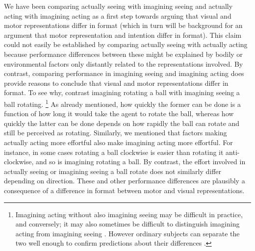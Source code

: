 \documentclass[12pt,\papersize]{extarticle}
\begin{document}
We have been comparing actually seeing with imagining seeing and actually acting with imagining acting as a first step towards arguing that visual and motor representations differ in format (which in turn will be background for an argument that motor representation and intention differ in format).  This claim could not easily be established by comparing actually seeing with actually acting because performance differences between these might be explained by bodily or environmental factors only distantly related to the representations involved. By contrast, comparing performance in imagining seeing and imagining acting does provide reasons to conclude that visual and motor representations differ in format. To see why, contrast imagining rotating a ball with imagining seeing a ball rotating.%
\footnote{Imagining acting without also imagining seeing may be difficult in practice, and conversely; it may also sometimes be difficult to distinguish imagining acting from imagining seeing \citep[as][p.\ 170 suggest]{currie:1997_mental}. However ordinary subjects can separate the two well enough to confirm predictions about their differences \citep[see, e.g.,][]{kosslyn:2001_imagining}.
}
As already mentioned, how quickly the former can be done is a function of how long it would take the agent to rotate the ball, whereas how quickly the latter can be done depends on how rapidly the ball can rotate and still be perceived as rotating. Similarly, we mentioned that factors making actually acting more effortful also make imagining acting more effortful. For instance, in some cases rotating a ball clockwise is easier than rotating it anti-clockwise, 
and so is imagining rotating a ball.  By contrast, the effort involved in actually seeing or imagining seeing a ball rotate does not similarly differ depending on direction.  These and other performance differences are plausibly a consequence of a difference in format between motor and visual representations.
\end{document}
